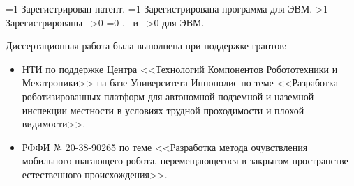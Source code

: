 {\begin{refsection}
        \ifnum \value{citeauthorpatent}=1%
            Зарегистрирован  патент.
        \fi%
        \ifnum \value{citeauthorprogram}=1%
            Зарегистрирована  программа для ЭВМ.
        \fi%
    \fi%
    \ifnum \value{citeregistered}>1%
        Зарегистрированы\ %
        \ifnum \value{citeauthorpatent}>0%
        \sloppy%
        \ifnum \value{citeauthorprogram}=0 . \else \ и~\fi%
        \fi%
        \ifnum \value{citeauthorprogram}>0%
         для ЭВМ.
        \fi%
    \fi%
\end{refsection}%
}

Диссертационная работа была выполнена при поддержке грантов:
\begin{itemize}
    \item НТИ по поддержке Центра <<Технологий Компонентов Робототехники и Мехатроники>> на базе Университета Иннополис по теме <<Разработка роботизированных платформ для автономной подземной и наземной инспекции местности в условиях трудной проходимости и плохой видимости>>. 
    \item РФФИ № 20-38-90265 по теме <<Разработка метода очувствления мобильного шагающего робота, перемещающегося в закрытом пространстве естественного происхождения>>.
\end{itemize}

